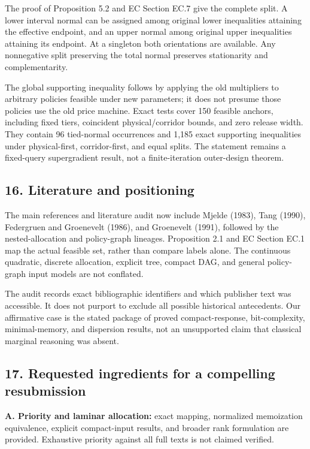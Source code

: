 \documentclass[
  11pt,
]{article}
\begin{document}
The proof of Proposition 5.2 and EC Section EC.7 give the complete
split. A lower interval normal can be assigned among original lower
inequalities attaining the effective endpoint, and an upper normal among
original upper inequalities attaining its endpoint. At a singleton both
orientations are available. Any nonnegative split preserving the total
normal preserves stationarity and complementarity.

The global supporting inequality follows by applying the old multipliers
to arbitrary policies feasible under new parameters; it does not presume
those policies use the old price machine. Exact tests cover 150 feasible
anchors, including fixed tiers, coincident physical/corridor bounds, and
zero release width. They contain 96 tied-normal occurrences and 1,185
exact supporting inequalities under physical-first, corridor-first, and
equal splits. The statement remains a fixed-query supergradient result,
not a finite-iteration outer-design theorem.

\subsection{16. Literature and
positioning}\label{literature-and-positioning}

The main references and literature audit now include Mjelde (1983), Tang
(1990), Federgruen and Groenevelt (1986), and Groenevelt (1991),
followed by the nested-allocation and policy-graph lineages. Proposition
2.1 and EC Section EC.1 map the actual feasible set, rather than compare
labels alone. The continuous quadratic, discrete allocation, explicit
tree, compact DAG, and general policy-graph input models are not
conflated.

The audit records exact bibliographic identifiers and which publisher
text was accessible. It does not purport to exclude all possible
historical antecedents. Our affirmative case is the stated package of
proved compact-response, bit-complexity, minimal-memory, and dispersion
results, not an unsupported claim that classical marginal reasoning was
absent.

\subsection{17. Requested ingredients for a compelling
resubmission}\label{requested-ingredients-for-a-compelling-resubmission}

\textbf{A. Priority and laminar allocation:} exact mapping, normalized
memoization equivalence, explicit compact-input results, and broader
rank formulation are provided. Exhaustive priority against all full
texts is not claimed verified.
\end{document}

